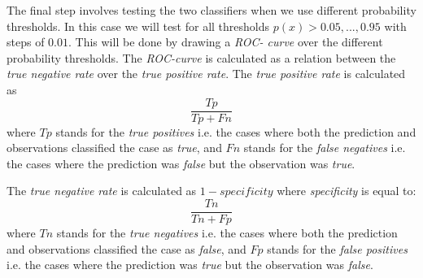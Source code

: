 \documentclass[a4paper,12pt]{article}
\begin{document}
The final step involves testing the two classifiers when we use different probability thresholds. In this case we will test for all thresholds \( p(x) > 0.05,...,0.95\) with steps of \(0.01\). This will be done by drawing a \textit{ROC- curve} over the different probability thresholds. The \textit{ROC-curve} is calculated as a relation between the \textit{true negative rate} over the \textit{true positive rate}. The \textit{true positive rate} is calculated as
\begin{equation}
 \frac{Tp}{Tp + Fn}
\end{equation}
where \(Tp\) stands for the \textit{true positives} i.e. the cases where both the prediction and observations classified the case as \textit{true}, and \(Fn\) stands for the \textit{false negatives} i.e. the cases where the prediction was \textit{false} but the observation was \textit{true}.

The \textit{true negative rate} is calculated as \(1 - specificity\) where \textit{specificity} is equal to:
\begin{equation}
 \frac{Tn}{Tn + Fp}
\end{equation}
where \(Tn\) stands for the \textit{true negatives} i.e. the cases where both the prediction and observations classified the case as \textit{false}, and \(Fp\) stands for the \textit{false positives} i.e. the cases where the prediction was \textit{true} but the observation was \textit{false}.
\end{document}

